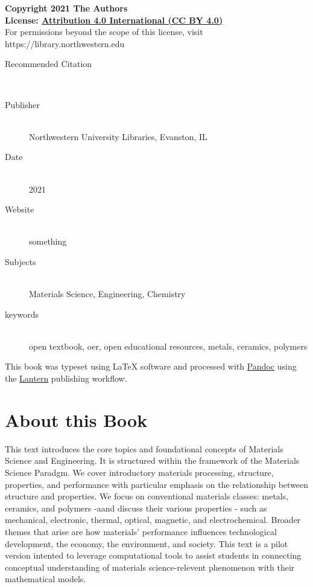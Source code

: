\documentclass{book}
\newcommand{\booklicense}{\href{}{Attribution 4.0 International (CC BY 4.0)}}
\begin{document}
\begin{flushleft}

\textbf{Copyright \textcopyright{} 2021  The Authors\\
License: \booklicense}\\[11pt] 


For permissions beyond the scope of this license, visit https://library.northwestern.edu

\vspace*{\fill}

\begin{description}
  \item[Recommended Citation] \hfill \\ 
  \item[Publisher] \hfill \\ Northwestern University Libraries, Evanston, IL
  \item[Date] \hfill \\ 2021
    \item[Website] \hfill \\ something
          \item[Subjects] \hfill \\ Materials Science, Engineering, Chemistry
  \item[keywords] \hfill \\ open textbook, oer, open educational
resources, metals, ceramics, polymers
  
\end{description}


\vspace*{\fill}

This book was typeset using \LaTeX{} software and processed with \href{https://pandoc.org}{Pandoc} using the \href{http://lantern.northwestern.pub}{Lantern} publishing workflow.\\

\end{flushleft}

\addtocounter{page}{2}

\chapter*{About this Book}
This text introduces the core topics and foundational concepts of Materials
Science and Engineering. It is structured within the framework of the
Materials Science Paradgm. We cover introductory materials processing,
structure, properties, and performance with particular emphasis on the
relationship between structure and properties. We focus on conventional
materials classes: metals, ceramics, and polymers -aand discuss their various
properties - such as mechanical, electronic, thermal, optical, magnetic, and
electrochemical. Broader themes that arise are how materials' performance
influences technological development, the economy, the environment, and
society. This text is a pilot version intented to leverage computational tools
to assist students in connecting conceptual understanding of materials
science-relevent phenomenon with their mathematical models.
\end{document}
